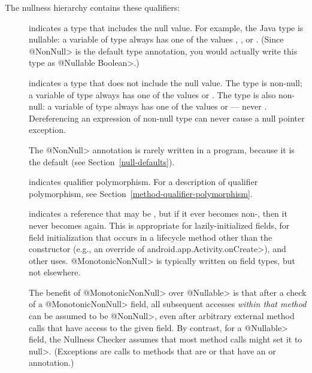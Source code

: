 
The nullness hierarchy contains these qualifiers:

\begin{description}

\item[]
  indicates a type that includes the null value.  For example, the Java
  type 
  is nullable:  a variable of type  always has one of the
  values , , or .
  (Since \<@NonNull> is the default type annotation, you would actually
  write this type as \<@Nullable Boolean>.)

\item[]
  indicates a type that does not include the null value.  The type
   is non-null; a variable of type  always has
  one of the values  or .  The type  is also non-null:  a variable of type 
  always has one of the values  or  --- never
  .  Dereferencing an expression of non-null type can never cause
  a null pointer exception.

  The \<@NonNull> annotation is rarely written in a program, because it is
  the default (see Section~\ref{null-defaults}).

\item[]
  indicates qualifier polymorphism.
  For a description of qualifier polymorphism, see
  Section~\ref{method-qualifier-polymorphism}.

\item[]
  indicates a reference that may be , but if it ever becomes
  non-, then it never becomes  again.  This is
  appropriate for lazily-initialized fields, for field initialization that
  occurs in a lifecycle method other than the constructor (e.g., an
  override of \<android.app.Activity.onCreate>), and other uses.
  \<@MonotonicNonNull> is typically written on field types, but not elsewhere.

  \begin{sloppypar}
  The benefit of \<@MonotonicNonNull> over \<@Nullable> is that after a
  check of a \<@MonotonicNonNull> field, all subsequent accesses
  \emph{within that method} can be assumed to be \<@NonNull>, even after
  arbitrary external method calls that have access to the given field.
  By contrast, for a \<@Nullable> field, the Nullness Checker assumes that
  most method calls might set it to \<null>. (Exceptions are calls to
  methods that are  or that
  have an  or
   annotation.)
  \end{sloppypar}


\end{description}
